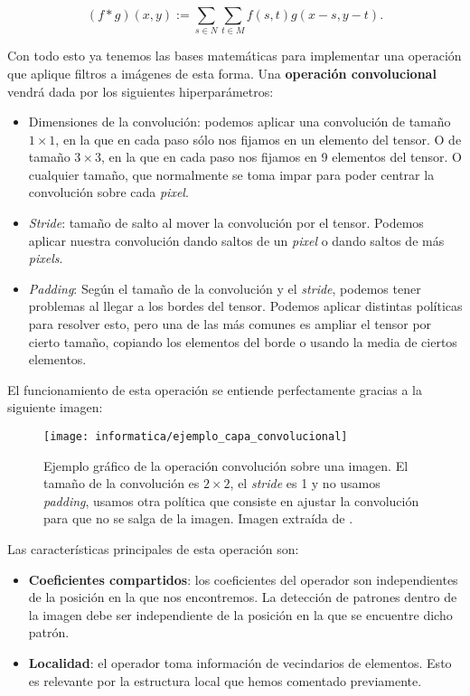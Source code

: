 \begin{equation}
    (f * g)(x, y) := \sum_{s \in N} \sum_{t \in M} f(s, t) g(x - s, y - t).
\end{equation}

Con todo esto ya tenemos las bases matemáticas para implementar una operación que aplique filtros a imágenes de esta forma. Una \textbf{operación convolucional} vendrá dada por los siguientes hiperparámetros:

\begin{itemize}
    \item Dimensiones de la convolución: podemos aplicar una convolución de tamaño $1 \times 1$, en la que en cada paso sólo nos fijamos en un elemento del tensor. O de tamaño $3 \times 3$, en la que en cada paso nos fijamos en 9 elementos del tensor. O cualquier tamaño, que normalmente se toma impar para poder centrar la convolución sobre cada \textit{pixel}.
    \item \textit{Stride}: tamaño de salto al mover la convolución por el tensor. Podemos aplicar nuestra convolución dando saltos de un \textit{pixel} o dando saltos de más \textit{pixels}.
    \item \textit{Padding}: Según el tamaño de la convolución y el \textit{stride}, podemos tener problemas al llegar a los bordes del tensor. Podemos aplicar distintas políticas para resolver esto, pero una de las más comunes es ampliar el tensor por cierto tamaño, copiando los elementos del borde o usando la media de ciertos elementos.
\end{itemize}

El funcionamiento de esta operación se entiende perfectamente gracias a la siguiente imagen:

\begin{figure}[H]
    \centering
    \texttt{[image: informatica/ejemplo\_capa\_convolucional]}
    \caption{Ejemplo gráfico de la operación convolución sobre una imagen. El tamaño de la convolución es $2 \times 2$, el \textit{stride} es 1 y no usamos \textit{padding}, usamos otra política que consiste en ajustar la convolución para que no se salga de la imagen. Imagen extraída de \cite{informatica:paper_definicion_cnn}.}
\end{figure}

Las características principales de esta operación son:

\begin{itemize}
    \item \textbf{Coeficientes compartidos}: los coeficientes del operador son independientes de la posición en la que nos encontremos. La detección de patrones dentro de la imagen debe ser independiente de la posición en la que se encuentre dicho patrón.
    \item \textbf{Localidad}: el operador toma información de vecindarios de elementos. Esto es relevante por la estructura local que hemos comentado previamente.
\end{itemize}

